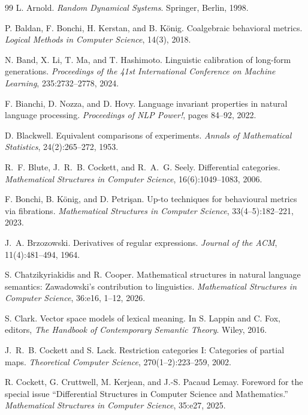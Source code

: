 \documentclass[11pt]{article}
\begin{document}
\begin{thebibliography}{99}
L. Arnold.
\emph{Random Dynamical Systems}.
Springer, Berlin, 1998.

P. Baldan, F. Bonchi, H. Kerstan, and B. K\"onig.
Coalgebraic behavioral metrics.
\emph{Logical Methods in Computer Science}, 14(3), 2018.

N. Band, X. Li, T. Ma, and T. Hashimoto.
Linguistic calibration of long-form generations.
\emph{Proceedings of the 41st International Conference on Machine Learning},
235:2732--2778, 2024.

F. Bianchi, D. Nozza, and D. Hovy.
Language invariant properties in natural language processing.
\emph{Proceedings of NLP Power!}, pages 84--92, 2022.

D. Blackwell.
Equivalent comparisons of experiments.
\emph{Annals of Mathematical Statistics}, 24(2):265--272, 1953.

R.~F. Blute, J.~R.~B. Cockett, and R.~A.~G. Seely.
Differential categories.
\emph{Mathematical Structures in Computer Science}, 16(6):1049--1083, 2006.

F. Bonchi, B. K\"onig, and D. Petri\c{s}an.
Up-to techniques for behavioural metrics via fibrations.
\emph{Mathematical Structures in Computer Science}, 33(4--5):182--221, 2023.

J.~A. Brzozowski.
Derivatives of regular expressions.
\emph{Journal of the ACM}, 11(4):481--494, 1964.

S. Chatzikyriakidis and R. Cooper.
Mathematical structures in natural language semantics: Zawadowski's contribution to linguistics.
\emph{Mathematical Structures in Computer Science}, 36:e16, 1--12, 2026.

S. Clark.
Vector space models of lexical meaning.
In S. Lappin and C. Fox, editors, \emph{The Handbook of Contemporary Semantic Theory}. Wiley, 2016.

J.~R.~B. Cockett and S. Lack.
Restriction categories I: Categories of partial maps.
\emph{Theoretical Computer Science}, 270(1--2):223--259, 2002.

R. Cockett, G. Cruttwell, M. Kerjean, and J.-S. Pacaud Lemay.
Foreword for the special issue ``Differential Structures in Computer Science and Mathematics.''
\emph{Mathematical Structures in Computer Science}, 35:e27, 2025.


\end{thebibliography}
\end{document}
